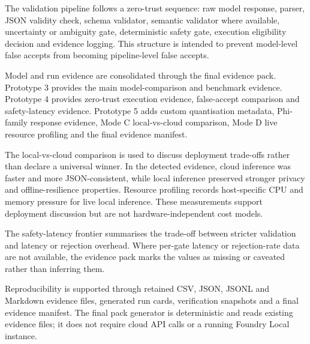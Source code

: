 \documentclass[sigconf,nonacm]{acmart}
\begin{document}
The validation pipeline follows a zero-trust sequence: raw model response, parser, JSON validity check, schema validator, semantic validator where available, uncertainty or ambiguity gate, deterministic safety gate, execution eligibility decision and evidence logging. This structure is intended to prevent model-level false accepts from becoming pipeline-level false accepts.

Model and run evidence are consolidated through the final evidence pack. Prototype 3 provides the main model-comparison and benchmark evidence. Prototype 4 provides zero-trust execution evidence, false-accept comparison and safety-latency evidence. Prototype 5 adds custom quantisation metadata, Phi-family response evidence, Mode C local-vs-cloud comparison, Mode D live resource profiling and the final evidence manifest.

The local-vs-cloud comparison is used to discuss deployment trade-offs rather than declare a universal winner. In the detected evidence, cloud inference was faster and more JSON-consistent, while local inference preserved stronger privacy and offline-resilience properties. Resource profiling records host-specific CPU and memory pressure for live local inference. These measurements support deployment discussion but are not hardware-independent cost models.

The safety-latency frontier summarises the trade-off between stricter validation and latency or rejection overhead. Where per-gate latency or rejection-rate data are not available, the evidence pack marks the values as missing or caveated rather than inferring them.

Reproducibility is supported through retained CSV, JSON, JSONL and Markdown evidence files, generated run cards, verification snapshots and a final evidence manifest. The final pack generator is deterministic and reads existing evidence files; it does not require cloud API calls or a running Foundry Local instance.
\end{document}
